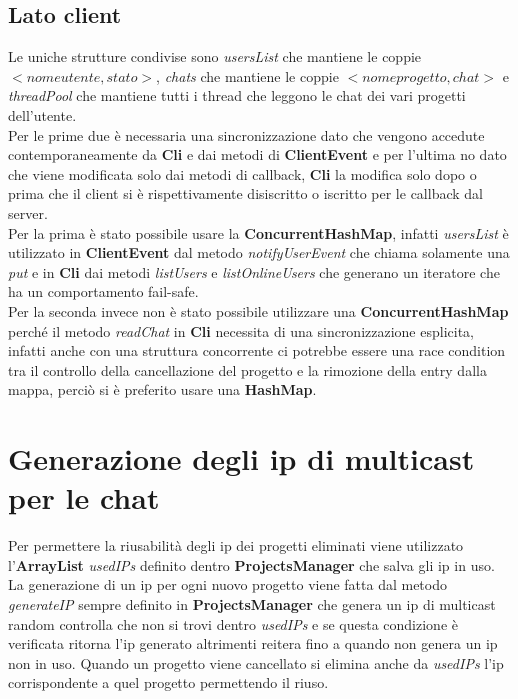 \documentclass[11pt]{report}
\begin{document}
	\subsection{Lato client}
	Le uniche strutture condivise sono \textit{usersList} che mantiene le coppie $<nome utente, stato>$, \textit{chats} che mantiene le coppie $<nome progetto, chat>$ e \textit{threadPool} che mantiene tutti i thread che leggono le chat dei vari progetti dell'utente.\\ 
	Per le prime due è necessaria una sincronizzazione dato che vengono accedute contemporaneamente da \textbf{Cli} e dai metodi di \textbf{ClientEvent} e per l'ultima no dato che viene modificata solo dai metodi di callback, \textbf{Cli} la modifica solo dopo o prima che il client si è rispettivamente disiscritto o iscritto per le callback dal server.\\
	Per la prima è stato possibile usare la \textbf{ConcurrentHashMap}, infatti \textit{usersList} è utilizzato in \textbf{ClientEvent} dal metodo \textit{notifyUserEvent} che chiama solamente una \textit{put} e in \textbf{Cli} dai metodi \textit{listUsers} e \textit{listOnlineUsers} che generano un iteratore che ha un comportamento fail-safe.\\
	Per la seconda invece non è stato possibile utilizzare una \textbf{ConcurrentHashMap} perché il metodo \textit{readChat} in \textbf{Cli} necessita di una sincronizzazione esplicita, infatti anche con una struttura concorrente ci potrebbe essere una race condition tra il controllo della cancellazione del progetto e la rimozione della entry dalla mappa, perciò si è preferito usare una \textbf{HashMap}.\\
	
	\section{Generazione degli ip di multicast per le chat}
	Per permettere la riusabilità degli ip dei progetti eliminati viene utilizzato l'\textbf{ArrayList} \textit{usedIPs} definito dentro \textbf{ProjectsManager} che salva gli ip in uso.
	La generazione di un ip per ogni nuovo progetto viene fatta dal metodo \textit{generateIP} sempre definito in \textbf{ProjectsManager} che genera un ip di multicast random controlla che non si trovi dentro \textit{usedIPs} e se questa condizione è verificata ritorna l'ip generato altrimenti reitera fino a quando non genera un ip non in uso.
	Quando un progetto viene cancellato si elimina anche da \textit{usedIPs} l'ip corrispondente a quel progetto permettendo il riuso.
	
\end{document}
